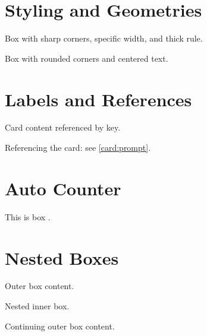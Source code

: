 \documentclass{article}
\begin{document}
\section{Styling and Geometries}

\begin{tcolorbox}[sharp corners, boxrule=2pt, width=0.8\textwidth]
Box with sharp corners, specific width, and thick rule.
\end{tcolorbox}

\begin{tcolorbox}[rounded corners, arc=3mm, halign=center]
Box with rounded corners and centered text.
\end{tcolorbox}

\section{Labels and References}

\begin{tcolorbox}[title=Prompt Card, label=card:prompt, breakable]
Card content referenced by key.
\end{tcolorbox}

Referencing the card: see \ref{card:prompt}.

\section{Auto Counter}
\begin{tcolorbox}[title=Numbered Box, auto counter]
This is box \thetcbcounter.
\end{tcolorbox}

\section{Nested Boxes}

\begin{tcolorbox}[title=Outer Box]
Outer box content.
\begin{tcolorbox}[title=Inner Box, colback=gray]
Nested inner box.
\end{tcolorbox}
Continuing outer box content.
\end{tcolorbox}
\end{document}
